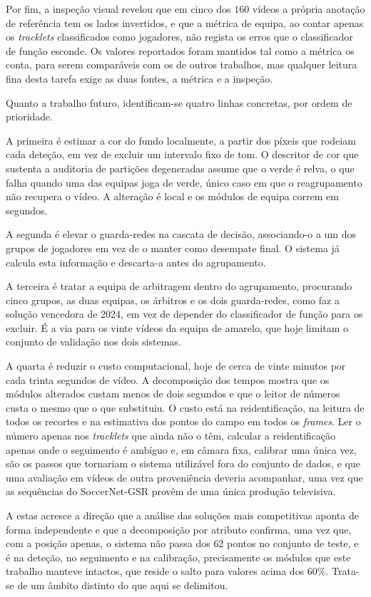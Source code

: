 Por fim, a inspeção visual revelou que em cinco dos $160$ vídeos a própria anotação de referência
tem os lados invertidos, e que a métrica de equipa, ao contar apenas os \emph{tracklets}
classificados como jogadores, não regista os erros que o classificador de função esconde. Os valores
reportados foram mantidos tal como a métrica os conta, para serem comparáveis com os de outros
trabalhos, mas qualquer leitura fina desta tarefa exige as duas fontes, a métrica e a inspeção.

Quanto a trabalho futuro, identificam-se quatro linhas concretas, por ordem de prioridade.

A primeira é estimar a cor do fundo localmente, a partir dos píxeis que rodeiam cada deteção, em vez
de excluir um intervalo fixo de tom. O descritor de cor que sustenta a auditoria de partições
degeneradas assume que o verde é relva, o que falha quando uma das equipas joga de verde, único caso
em que o reagrupamento não recupera o vídeo. A alteração é local e os módulos de equipa correm em
segundos.

A segunda é elevar o guarda-redes na cascata de decisão, associando-o a um dos grupos de jogadores
em vez de o manter como desempate final. O sistema já calcula esta informação e descarta-a antes do
agrupamento.

A terceira é tratar a equipa de arbitragem dentro do agrupamento, procurando cinco grupos, as duas
equipas, os árbitros e os dois guarda-redes, como faz a solução vencedora de 2024, em vez de
depender do classificador de função para os excluir. É a via para os vinte vídeos da equipa de
amarelo, que hoje limitam o conjunto de validação nos dois sistemas.

A quarta é reduzir o custo computacional, hoje de cerca de vinte minutos por cada trinta segundos de
vídeo. A decomposição dos tempos mostra que os módulos alterados custam menos de dois segundos e que
o leitor de números custa o mesmo que o que substituiu. O custo está na reidentificação, na leitura
de todos os recortes e na estimativa dos pontos do campo em todos os \emph{frames}. Ler o número
apenas nos \emph{tracklets} que ainda não o têm, calcular a reidentificação apenas onde o seguimento
é ambíguo e, em câmara fixa, calibrar uma única vez, são os passos que tornariam o sistema
utilizável fora do conjunto de dados, e que uma avaliação em vídeos de outra proveniência deveria
acompanhar, uma vez que as sequências do SoccerNet-GSR provêm de uma única produção televisiva.

A estas acresce a direção que a análise das soluções mais competitivas aponta de forma independente
e que a decomposição por atributo confirma, uma vez que, com a posição apenas, o sistema não passa dos
$62$ pontos no conjunto de teste, e é na deteção, no seguimento e na calibração,
precisamente os módulos que este trabalho manteve intactos, que reside o salto para valores acima
dos $60\%$. Trata-se de um âmbito distinto do que aqui se delimitou.

